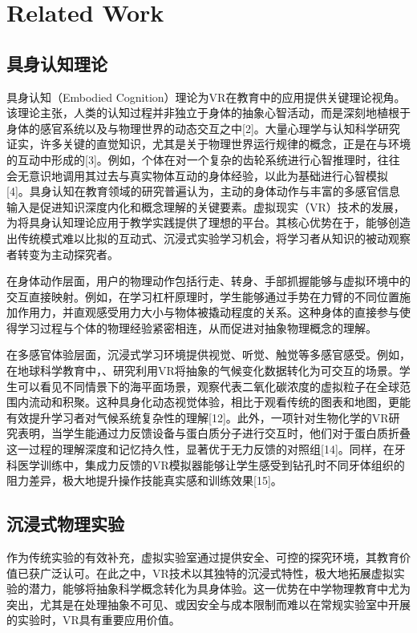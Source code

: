 \section{Related Work}

\subsection{具身认知理论}

具身认知（Embodied Cognition）理论为VR在教育中的应用提供关键理论视角。该理论主张，人类的认知过程并非独立于身体的抽象心智活动，而是深刻地植根于身体的感官系统以及与物理世界的动态交互之中[2]。大量心理学与认知科学研究证实，许多关键的直觉知识，尤其是关于物理世界运行规律的概念，正是在与环境的互动中形成的[3]。例如，个体在对一个复杂的齿轮系统进行心智推理时，往往会无意识地调用其过去与真实物体互动的身体经验，以此为基础进行心智模拟[4]。具身认知在教育领域的研究普遍认为，主动的身体动作与丰富的多感官信息输入是促进知识深度内化和概念理解的关键要素。虚拟现实（VR）技术的发展，为将具身认知理论应用于教学实践提供了理想的平台。其核心优势在于，能够创造出传统模式难以比拟的互动式、沉浸式实验学习机会，将学习者从知识的被动观察者转变为主动探究者。

在身体动作层面，用户的物理动作包括行走、转身、手部抓握能够与虚拟环境中的交互直接映射。例如，在学习杠杆原理时，学生能够通过手势在力臂的不同位置施加作用力，并直观感受用力大小与物体被撬动程度的关系。这种身体的直接参与使得学习过程与个体的物理经验紧密相连，从而促进对抽象物理概念的理解。

在多感官体验层面，沉浸式学习环境提供视觉、听觉、触觉等多感官感受。例如，在地球科学教育中，、研究利用VR将抽象的气候变化数据转化为可交互的场景。学生可以看见不同情景下的海平面场景，观察代表二氧化碳浓度的虚拟粒子在全球范围内流动和积聚。这种具身化动态视觉体验，相比于观看传统的图表和地图，更能有效提升学习者对气候系统复杂性的理解[12]。此外，一项针对生物化学的VR研究表明，当学生能通过力反馈设备与蛋白质分子进行交互时，他们对于蛋白质折叠这一过程的理解深度和记忆持久性，显著优于无力反馈的对照组[14]。同样，在牙科医学训练中，集成力反馈的VR模拟器能够让学生感受到钻孔时不同牙体组织的阻力差异，极大地提升操作技能真实感和训练效果[15]。

\subsection{沉浸式物理实验}
作为传统实验的有效补充，虚拟实验室通过提供安全、可控的探究环境，其教育价值已获广泛认可。在此之中，VR技术以其独特的沉浸式特性，极大地拓展虚拟实验的潜力，能够将抽象科学概念转化为具身体验。这一优势在中学物理教育中尤为突出，尤其是在处理抽象不可见、或因安全与成本限制而难以在常规实验室中开展的实验时，VR具有重要应用价值。

